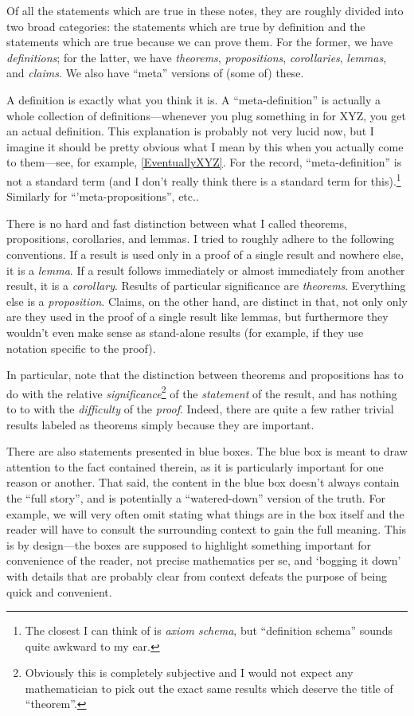 Of all the statements which are true in these notes, they are roughly divided into two broad categories:  the statements which are true by definition and the statements which are true because we can prove them.  For the former, we have \emph{definitions}; for the latter, we have \emph{theorems}, \emph{propositions}, \emph{corollaries}, \emph{lemmas}, and \emph{claims}.  We also have ``meta'' versions of (some of) these.

A definition is exactly what you think it is.  A ``meta-definition'' is actually a whole collection of definitions---whenever you plug something in for XYZ, you get an actual definition.  This explanation is probably not very lucid now, but I imagine it should be pretty obvious what I mean by this when you actually come to them---see, for example, \cref{EventuallyXYZ}.  For the record, ``meta-definition'' is not a standard term (and I don't really think there is a standard term for this).\footnote{The closest I can think of is \emph{axiom schema}, but ``definition schema'' sounds quite awkward to my ear.}  Similarly for ``'meta-propositions'', etc..

There is no hard and fast distinction between what I called theorems, propositions, corollaries, and lemmas.  I tried to roughly adhere to the following conventions.  If a result is used only in a proof of a single result and nowhere else, it is a \emph{lemma}.  If a result follows immediately or almost immediately from another result, it is a \emph{corollary}.  Results of particular significance are \emph{theorems}.  Everything else is a \emph{proposition}.  Claims, on the other hand, are distinct in that, not only only are they used in the proof of a single result like lemmas, but furthermore they wouldn't even make sense as stand-alone results (for example, if they use notation specific to the proof).

In particular, note that the distinction between theorems and propositions has to do with the relative \emph{significance}\footnote{Obviously this is completely subjective and I would not expect any mathematician to pick out the exact same results which deserve the title of ``theorem''.} of the \emph{statement} of the result, and has nothing to to with the \emph{difficulty} of the \emph{proof}.  Indeed, there are quite a few rather trivial results labeled as theorems simply because they are important.

There are also statements presented in blue boxes.  The blue box is meant to draw attention to the fact contained therein, as it is particularly important for one reason or another.  That said, the content in the blue box doesn't always contain the ``full story'', and is potentially a ``watered-down'' version of the truth.  For example, we will very often omit stating what things are in the box itself and the reader will have to consult the surrounding context to gain the full meaning.  This is by design---the boxes are supposed to highlight something important for convenience of the reader, not precise mathematics per se, and `bogging it down' with details that are probably clear from context defeats the purpose of being quick and convenient.

